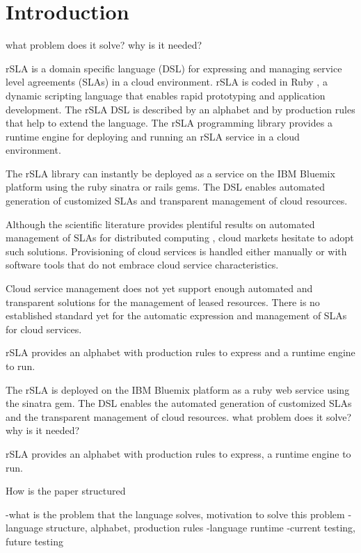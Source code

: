 \section{Introduction}
\label{sec:introduction}

what problem does it solve? why is it needed? 

rSLA is a domain specific language (DSL) for expressing and managing service level agreements (SLAs) in a cloud environment. rSLA is coded in Ruby \cite{ruby}, a dynamic scripting language that enables rapid prototyping and application development. The rSLA DSL is described by an alphabet and by production rules that help to extend the language. The rSLA programming library provides a runtime engine for deploying and running an rSLA service in a cloud environment.

The rSLA library can instantly be deployed as a service on the IBM Bluemix platform using the ruby sinatra or rails gems. The DSL enables automated generation of customized SLAs and transparent management of cloud resources.

Although the scientific literature provides plentiful results on automated management of SLAs for distributed computing \cite{wsla, wsag, more}, cloud markets hesitate to adopt such solutions. Provisioning of cloud services is handled either manually or with software tools that do not embrace cloud service characteristics.

Cloud service management does not yet support enough automated and transparent solutions for the management of leased resources. There is no established standard yet for the automatic expression and management of SLAs for cloud services.

rSLA provides an alphabet with production rules to express and a runtime engine to run.

The rSLA is deployed on the IBM Bluemix platform as a ruby web service using the sinatra gem. 
The DSL enables the automated generation of customized SLAs and the transparent management of cloud resources.
what problem does it solve? why is it needed?

rSLA provides an alphabet with production rules to express, a runtime engine to run.

How is the paper structured

-what is the problem that the language solves, motivation to solve this problem
-language structure, alphabet, production rules
-language runtime
-current testing, future testing